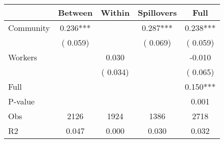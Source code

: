 
\begin{tabular}{l*{4}{c}}\hline&\multicolumn{1}{c}{Between}&\multicolumn{1}{c}{Within}&\multicolumn{1}{c}{Spillovers}&\multicolumn{1}{c}{Full}\\ \hline
 Community             &              0.236***      &                                               &        0.287*** &         0.238***                            \\ 
                               &        (       0.059)           &                                       &       (       0.069)     &      (       0.059)                                           \\ 
 Workers       &                                               &        0.030    &                                &            -0.010                            \\ 
                               &                                               & (       0.034)                  &                                        &      (       0.065)                                           \\ 
\hline                                                                                                                                                                                                                                            
 Full                  &                                               &                                               &                                        &             0.150***                                     \\ 
 P-value               &                                               &                                               &                                        &             0.001                                           \\ 
 Obs                   &               2126               &       1924                       &       1386                &              2718                                               \\ 
 R2                    &                      0.047              &              0.000                      &              0.030               &                     0.032                                              \\ 
\hline \end{tabular}                                                                                                                                                                                                              